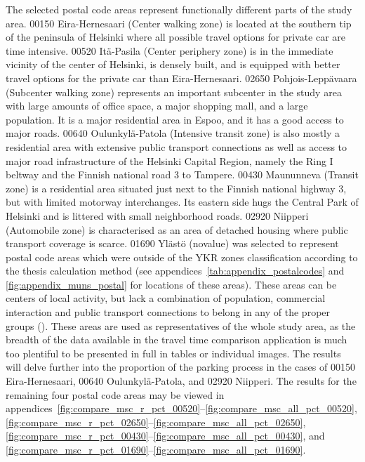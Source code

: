 The selected postal code areas represent functionally different parts of the study area. 00150 Eira-Hernesaari (Center walking zone) is located at the southern tip of the peninsula of Helsinki where all possible travel options for private car are time intensive. 00520 Itä-Pasila (Center periphery zone) is in the immediate vicinity of the center of Helsinki, is densely built, and is equipped with better travel options for the private car than Eira-Hernesaari. 02650 Pohjois-Leppävaara (Subcenter walking zone) represents an important subcenter in the study area with large amounts of office space, a major shopping mall, and a large population. It is a major residential area in Espoo, and it has a good access to major roads. 00640 Oulunkylä-Patola (Intensive transit zone) is also mostly a residential area with extensive public transport connections as well as access to major road infrastructure of the Helsinki Capital Region, namely the Ring I beltway and the Finnish national road 3 to Tampere. 00430 Maununneva (Transit zone) is a residential area situated just next to the Finnish national highway 3, but with limited motorway interchanges. Its eastern side hugs the Central Park of Helsinki and is littered with small neighborhood roads. 02920 Niipperi (Automobile zone) is characterised as an area of detached housing where public transport coverage is scarce. 01690 Ylästö (novalue) was selected to represent postal code areas which were outside of the YKR zones classification according to the thesis calculation method (see appendices~\ref{tab:appendix_postalcodes} and \ref{fig:appendix_muns_postal} for locations of these areas). These areas can be centers of local activity, but lack a combination of population, commercial interaction and public transport connections to belong in any of the proper  groups (\cite{Ristimaki2017}). These areas are used as representatives of the whole study area, as the breadth of the data available in the travel time comparison application is much too plentiful to be presented in full in tables or individual images. The results will delve further into the proportion of the parking process in the cases of 00150 Eira-Hernesaari, 00640 Oulunkylä-Patola, and 02920 Niipperi. The results for the remaining four postal code areas may be viewed in appendices~\ref{fig:compare_msc_r_pct_00520}--\ref{fig:compare_msc_all_pct_00520}, \ref{fig:compare_msc_r_pct_02650}--\ref{fig:compare_msc_all_pct_02650}, \ref{fig:compare_msc_r_pct_00430}--\ref{fig:compare_msc_all_pct_00430}, and \ref{fig:compare_msc_r_pct_01690}--\ref{fig:compare_msc_all_pct_01690}.


